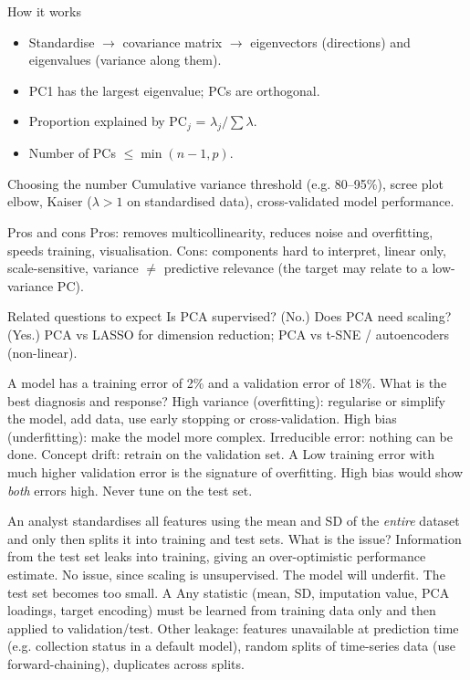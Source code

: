 {\begin{block}{How it works}
		\begin{itemize}
			\item Standardise $\rightarrow$ covariance matrix $\rightarrow$ eigenvectors (directions) and eigenvalues (variance along them).
			\item PC1 has the largest eigenvalue; PCs are orthogonal.
			\item Proportion explained by PC$_j$ = $\lambda_j/\sum\lambda$.
			\item Number of PCs $\le \min(n-1,p)$.
	\end{itemize}\end{block}
	\begin{block}{Choosing the number}
		Cumulative variance threshold (e.g. 80--95\%), scree plot elbow, Kaiser ($\lambda>1$ on standardised data), cross-validated model performance.
\end{block}}
{\begin{block}{Pros and cons}
		Pros: removes multicollinearity, reduces noise and overfitting, speeds training, visualisation. Cons: components hard to interpret, linear only, scale-sensitive, variance $\neq$ predictive relevance (the target may relate to a low-variance PC).
	\end{block}
	\begin{alertblock}{Related questions to expect}
		Is PCA supervised? (No.) Does PCA need scaling? (Yes.) PCA vs LASSO for dimension reduction; PCA vs t-SNE / autoencoders (non-linear).
\end{alertblock}}

{A model has a training error of 2\% and a validation error of 18\%. What is the best diagnosis and response?}
{High variance (overfitting): regularise or simplify the model, add data, use early stopping or cross-validation.}
{High bias (underfitting): make the model more complex.}
{Irreducible error: nothing can be done.}
{Concept drift: retrain on the validation set.}
{A}
{Low training error with much higher validation error is the signature of overfitting. High bias would show \emph{both} errors high. Never tune on the test set.}

{An analyst standardises all features using the mean and SD of the \emph{entire} dataset and only then splits it into training and test sets. What is the issue?}
{Information from the test set leaks into training, giving an over-optimistic performance estimate.}
{No issue, since scaling is unsupervised.}
{The model will underfit.}
{The test set becomes too small.}
{A}
{Any statistic (mean, SD, imputation value, PCA loadings, target encoding) must be learned from training data only and then applied to validation/test. Other leakage: features unavailable at prediction time (e.g. collection status in a default model), random splits of time-series data (use forward-chaining), duplicates across splits.}

